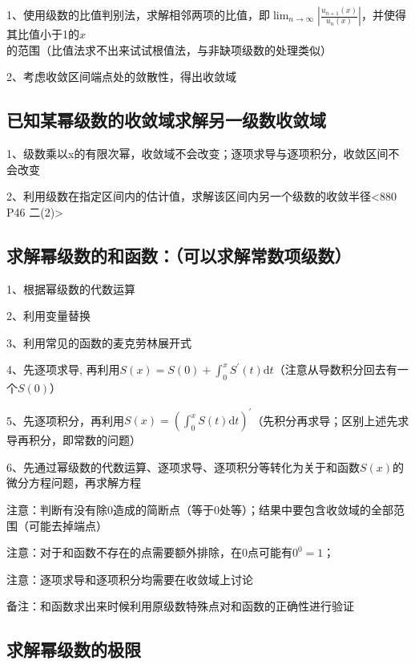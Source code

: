 1、使用级数的比值判别法，求解相邻两项的比值，即$\lim _{n \rightarrow \infty}\left|\frac{u_{n+1}(x)}{u_{n}(x)}\right|$，并使得其比值小于1的$x$的范围（比值法求不出来试试根值法，与非缺项级数的处理类似）

2、考虑收敛区间端点处的敛散性，得出收敛域



\subsection{已知某幂级数的收敛域求解另一级数收敛域}

1、级数乘以x的有限次幂，收敛域不会改变；逐项求导与逐项积分，收敛区间不会改变

2、利用级数在指定区间内的估计值，求解该区间内另一个级数的收敛半径<880 P46 二(2)>



\subsection{求解幂级数的和函数：（可以求解常数项级数）}

1、根据幂级数的代数运算

2、利用变量替换

3、利用常见的函数的麦克劳林展开式

4、先逐项求导, 再利用$S(x)=S(0)+\int_{0}^{x} S^{\prime}(t) \mathrm{d} t$（注意从导数积分回去有一个$S(0)$）

5、先逐项积分，再利用$S(x)=\left(\int_{0}^{x} S(t) \mathrm{d} t\right)^{\prime}$（先积分再求导；区别上述先求导再积分，即常数的问题）

6、先通过幂级数的代数运算、逐项求导、逐项积分等转化为关于和函数$S(x)$的微分方程问题，再求解方程

注意：判断有没有除0造成的简断点（等于0处等）；结果中要包含收敛域的全部范围（可能去掉端点）

注意：对于和函数不存在的点需要额外排除，在0点可能有$0^0=1$；

注意：逐项求导和逐项积分均需要在收敛域上讨论

备注：和函数求出来时候利用原级数特殊点对和函数的正确性进行验证



\subsection{求解幂级数的极限}

